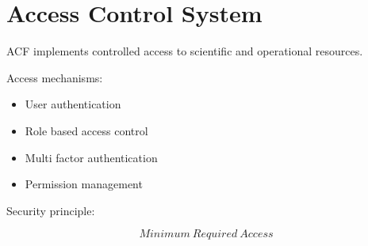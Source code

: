 \section{Access Control System}


ACF implements controlled access to scientific and operational
resources.



Access mechanisms:


\begin{itemize}

\item User authentication

\item Role based access control

\item Multi factor authentication

\item Permission management

\end{itemize}



Security principle:


\[
Minimum\ Required\ Access
\]


